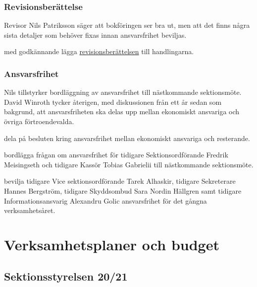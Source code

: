 \documentclass[hidelinks]{sektionsmote}
\begin{document}
\subsubsection{Revisionsberättelse}
Revisor Nils Patriksson säger att bokföringen ser bra ut, men att det finns några sista detaljer som behöver fixas innan ansvarsfrihet beviljas.
\begin{beslut}
    \item med godkännande lägga \hyperlink{bilagor/styret/rb.pdf.1}{revisionsberättelsen} till handlingarna.
\end{beslut}

\subsubsection{Ansvarsfrihet}
Nils tillstyrker bordläggning av ansvarsfrihet till nästkommande sektionsmöte.
David Winroth tycker återigen, med diskussionen från ett år sedan som bakgrund, att ansvarsfriheten ska delas upp mellan ekonomiskt ansvariga och övriga förtroendevalda.
\begin{beslut}
    \item dela på besluten kring ansvarsfrihet mellan ekonomiskt ansvariga och resterande.
\end{beslut}
\begin{beslut}
    \item bordlägga frågan om ansvarsfrihet för tidigare Sektionsordförande Fredrik Meisingseth och tidigare Kassör Tobias Gabrielii till nästkommande sektionsmöte.
\end{beslut}
\begin{beslut}
    \item bevilja tidigare Vice sektionsordförande Tarek Alhaskir, tidigare Sekreterare Hannes Bergström, tidigare Skyddsombud Sara Nordin Hällgren samt tidigare Informationsansvarig Alexandru Golic ansvarsfrihet för det gångna verksamhetsåret.
\end{beslut}

\section{Verksamhetsplaner och budget}

\subsection{Sektionsstyrelsen 20/21}
\end{document}
